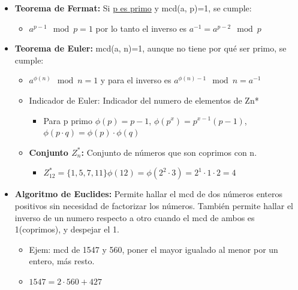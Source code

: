 \documentclass[12pt, twoside, openright]{report} %
\begin{document}
  \begin{itemize}
  \item \textbf{Teorema de Fermat:} Si \underline{p es primo} y mcd(a, p)=1,
    se cumple:
    

    \begin{itemize}
    \item $a^{p-1} \mod p = 1$ por lo tanto el inverso es $a^{-1} = a^{p-2} \mod p$
      
    \end{itemize}
  \item \textbf{Teorema de Euler:} mcd(a, n)=1, aunque no tiene por qué ser
    primo, se cumple:
    

    \begin{itemize}
    \item $a^{\phi(n)} \mod n = 1$ y para el inverso es $a^{\phi(n)-1} \mod n = a^{-1}$
      
    \item Indicador de Euler: Indicador del numero de elementos de Zn*
    \begin{itemize}
		\item Para p primo $\phi(p)=p-1$, $\phi(p^x)=p^{x-1}(p-1)$, $\phi(p\cdot q) = \phi(p)\cdot\phi(q)$
	\end{itemize}
      
    \item \textbf{Conjunto $Z_n^*$:} Conjunto de números que son coprimos con n.
      

      \begin{itemize}
      \item $Z_{1 2}^* = \{ 1, 5, 7, 11\} \phi(12) = \phi(2^2\cdot 3)=2^1 \cdot 1 \cdot 2 = 4$
        
      \end{itemize}
    \end{itemize}
  \item \textbf{Algoritmo de Euclides:} Permite hallar el mcd de dos números
    enteros positivos sin necesidad de factorizar los números. También
    permite hallar el inverso de un numero respecto a otro cuando el mcd
    de ambos es 1(coprimos), y despejar el 1.
    

    \begin{itemize}
    \item Ejem: mcd de 1547 y 560, poner el mayor igualado al menor por un
      entero, más resto.
      
    \item $1547 = 2 · 560 + 427$
      

\end{itemize}
\end{itemize}
\end{document}
